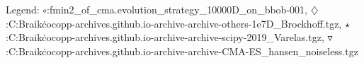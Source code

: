 Legend: {\color{NavyBlue}$\circ$}:fmin2\_of\_cma.evolution\_strategy\_10000D\_on\_bbob-001, {\color{Magenta}$\diamondsuit$}:C:\Users\Zeidan Braik\.cocopp\data-archives\numbbo.github.io\data-archive\data-archive\bbob{}-others-1e7D\_Brockhoff.tgz, {\color{Orange}$\star$}:C:\Users\Zeidan Braik\.cocopp\data-archives\numbbo.github.io\data-archive\data-archive\bbob{}\BFGS-scipy-2019\_Varelas.tgz, {\color{CornflowerBlue}$\triangledown$}:C:\Users\Zeidan Braik\.cocopp\data-archives\numbbo.github.io\data-archive\data-archive\bbob{}\BIPOP-CMA-ES\_hansen\_noiseless.tgz